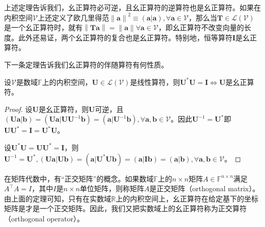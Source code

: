 \documentclass[main.tex]{subfiles}
\begin{document}
上述定理告诉我们，幺正算符必可逆，且幺正算符的逆算符也是幺正算符。如果在内积空间$\mathcal{V}$上还定义了欧几里得范$\left\|\mathbf{a}\right\|^2\equiv\left(\mathbf{a}|\mathbf{a}\right),\forall\mathbf{a}\in\mathcal{V}$，那么当$\mathbf{T}\in\mathcal{L}\left(\mathcal{V}\right)$是一个幺正算符时，就有$\left\|\mathbf{Ta}\right\|=\left\|\mathbf{a}\right\|\forall\mathbf{a}\in\mathcal{V}$，即幺正算符不改变向量的长度。此外还易证，两个幺正算符的复合也是幺正算符。特别地，恒等算符$\mathbf{I}$是幺正算符。

下一条定理告诉我们幺正算符的伴随算符有何性质。

\begin{theorem}\label{thm:II.6.4}
设$\mathcal{V}$是数域$\mathbb{F}$上的内积空间，$\mathbf{U}\in\mathcal{L}\left(\mathcal{V}\right)$是线性算符，则$\mathbf{U}^*\mathbf{U}=\mathbf{I}\Leftrightarrow\mathbf{U}$是幺正算符。
\end{theorem}
\begin{proof}
设$\mathbf{U}$是幺正算符，则$\mathbf{U}$可逆，且$\left(\mathbf{Ua}|\mathbf{b}\right)=\left(\mathbf{Ua}|\mathbf{UU}^{-1}\mathbf{b}\right)=\left(\mathbf{a}|\mathbf{U}^{-1}\mathbf{b}\right),\forall\mathbf{a},\mathbf{b}\in\mathcal{V}$。因此$\mathbf{U}^{-1}=\mathbf{U}^*$即$\mathbf{UU}^*=\mathbf{I}=\mathbf{U}^*\mathbf{U}$。

设$\mathbf{U}^*\mathbf{U}=\mathbf{UU}^*=\mathbf{I}$，则$\mathbf{U}^{-1}=\mathbf{U}^*,\left(\mathbf{Ua}|\mathbf{Ub}\right)=\left(\mathbf{a}|\mathbf{U}^*\mathbf{Ub}\right)=\left(\mathbf{a}|\mathbf{Ib}\right)=\left(\mathbf{a}|\mathbf{b}\right),\forall\mathbf{a},\mathbf{b}\in\mathcal{V}$。
\end{proof}

在矩阵代数中，有“正交矩阵”的概念。如果数域$\mathbb{F}$上的$n\times n$矩阵$A\in\mathbb{F}^{n\times n}$满足$A^\intercal A=I$，其中$I$是$n\times n$单位矩阵，则称矩阵$A$是正交矩阵（orthogonal matrix）。由上面的定理可知，只有在实数域$\mathbb{R}$上的内积空间上，幺正算符在给定基下的坐标矩阵是才是一个正交矩阵。因此，我们又把实数域上的幺正算符称为正交算符（orthogonal operator）。
\end{document}
